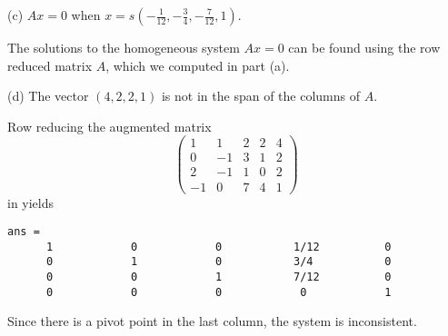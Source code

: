 \documentclass{ximera}
\begin{document}
\begin{exercise}
\begin{solution}
(c) \ans $Ax = 0$ when $x = s(-\frac{1}{12},-\frac{3}{4}, -\frac{7}{12},1)$.

\soln The solutions to the homogeneous system $Ax = 0$ can be found
using the row reduced matrix $A$, which we computed in part (a).

(d) \ans The vector $(4,2,2,1)$ is not in the span of the columns of
$A$.

\soln Row reducing the augmented matrix
\[
\left(\begin{array}{rrrr|r} 1 & 1 & 2 & 2 & 4 \\ 0 & -1 & 3 &
1 & 2 \\ 2 & -1 & 1 & 0 & 2 \\ -1 & 0 & 7 & 4 & 1 \end{array}\right)
\]
in \Matlab yields
\begin{verbatim}
ans =
      1            0            0           1/12          0      
      0            1            0           3/4           0      
      0            0            1           7/12          0      
      0            0            0            0            1      
\end{verbatim}
Since there is a pivot point in the last column, the system is
inconsistent.




\end{solution}
\end{exercise}
\end{document}
